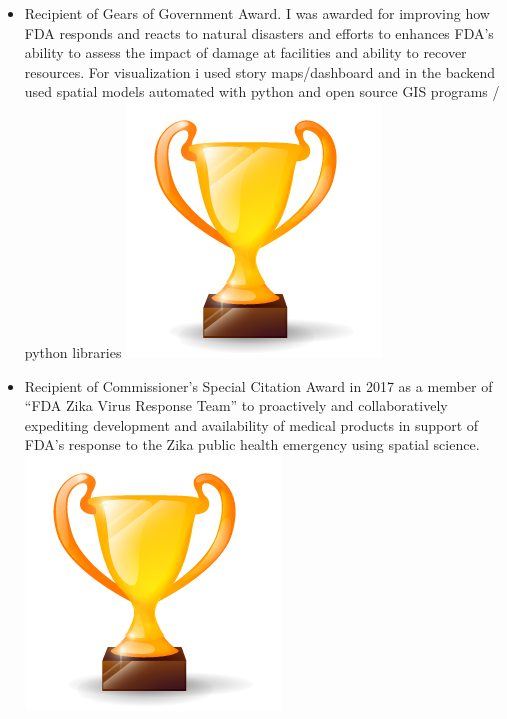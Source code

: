 \documentclass[letterpaper]{twentysecondcv} %
\begin{document}
\begin{twenty}
{{\begin{itemize}
\vspace{1mm}
        \item  Recipient of Gears of Government Award. I was awarded for improving how FDA responds and reacts to natural disasters and efforts to enhances FDA’s ability to assess the impact of damage at facilities and ability to recover resources. For visualization i used story maps/dashboard and in the backend used spatial models automated with python and open source GIS programs / python libraries \includegraphics[scale=0.05]{img/trophy.png}
        
    	\item Recipient of Commissioner’s Special Citation Award in 2017 as a member of “FDA Zika Virus Response Team” to proactively and collaboratively expediting development and availability of medical products in support of FDA’s response to the Zika public health emergency using spatial science.	\includegraphics[scale=0.05]{img/trophy.png}
\vspace{1mm}



\end{itemize}}}
\end{twenty}
\end{document}
